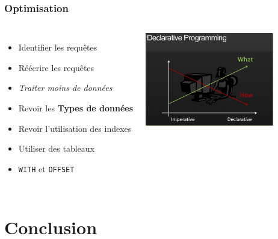 \documentclass{beamer}
\begin{document}
\begin{frame}
  \frametitle{Optimisation}

  \vfill

\begin{columns}[c]
\begin{itemize}
  \item<1-> Identifier les requêtes
  \item<1-> Réécrire les requêtes
  \item<2-> \textit{Traiter moins de données}
  \item<2-> Revoir les \textbf{Types de données}
  \item<2-> Revoir l'utilisation des indexes
  \item<2-> Utiliser des tableaux
  \item<3-> \texttt{WITH} et \texttt{OFFSET}
\end{itemize}

\begin{center}
  \includegraphics[height=11em]{declarative.png}
\end{center}
\end{columns}
\end{frame}

\section{Conclusion}

\end{document}
